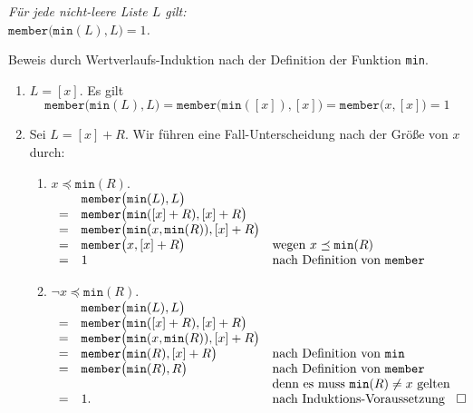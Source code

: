 \begin{Lemma} 
{\em
  F\"ur jede nicht-leere Liste $L$ gilt: \\[0.1cm]
  \hspace*{1.3cm} 
  $\mathtt{member}\bigl(\mathtt{min}(L), L\bigr) = 1$.
}
\end{Lemma}
Beweis durch Wertverlaufs-Induktion nach der Definition der Funktion \texttt{min}.
\begin{enumerate}
\item $L = [x]$.  Es gilt
      \[
        \mathtt{member}\bigl(\mathtt{min}(L), L\bigr)  = 
        \mathtt{member}\bigl(\mathtt{min}([x]), [x]\bigr) 
         =  \mathtt{member}\bigl(x, [x]\bigr) = 1
      \]
\item Sei $L = [x] + R$.  Wir f\"uhren eine Fall-Unterscheidung nach der Gr\"o\ss{}e von $x$
      durch:
      \begin{enumerate}
      \item $x \preceq \mathtt{min}(R)$. \\[0.1cm]
        \hspace*{1.3cm} 
      $
      \begin{array}[b]{cll}
        & \mathtt{member}\bigl( \mathtt{min}(L), L \bigr) \\
      = & \mathtt{member}\bigl( \mathtt{min}([x]+R), [x] + R \bigr) \\
      = & \mathtt{member}\bigl( \mathtt{min}(x,\mathtt{min}(R)), [x] + R \bigr) \\
      = & \mathtt{member}\bigl( x, [x] + R \bigr) & 
          \mbox{wegen $x \preceq \mathtt{min}(R)$} \\
      = & 1 & 
          \mbox{nach Definition von \texttt{member}} \\
      \end{array}
      $
      \item $\neg x \preceq \mathtt{min}(R)$. \\[0.1cm]
        \hspace*{1.3cm} 
      $
      \begin{array}[b]{cll}
        & \mathtt{member}\bigl( \mathtt{min}(L), L \bigr) \\
      = & \mathtt{member}\bigl( \mathtt{min}([x]+R), [x] + R \bigr) \\
      = & \mathtt{member}\bigl( \mathtt{min}(x,\mathtt{min}(R)), [x] + R \bigr) \\
      = & \mathtt{member}\bigl( \mathtt{min}(R), [x] + R \bigr) & 
          \mbox{nach Definition von \texttt{min}} \\
      = & \mathtt{member}\bigl( \mathtt{min}(R), R \bigr) & 
          \mbox{nach Definition von \texttt{member}} \\
        & & \mbox{denn es muss $\mathtt{min}(R) \not= x$ gelten} \\
      = & 1. & 
          \mbox{nach Induktions-Voraussetzung} 
      \end{array}\hspace*{\fill} \Box
      $
      \end{enumerate}
\end{enumerate}

